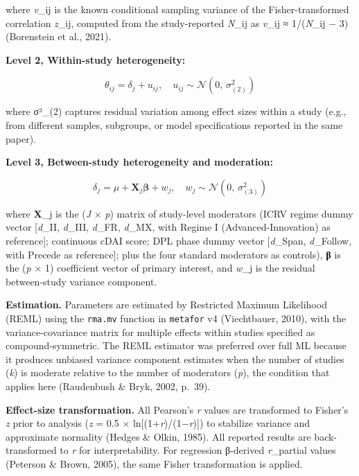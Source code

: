 \documentclass[
  12pt,a4paper]{article}
\begin{document}
where \emph{v}\_ij is the known conditional sampling variance of the
Fisher-transformed correlation \emph{z}\_ij, computed from the
study-reported \emph{N}\_ij as \emph{v}\_ij ≈ 1/(\emph{N}\_ij − 3)
(Borenstein et al., 2021).

\textbf{Level 2, Within-study heterogeneity:}

\[\theta_{ij} = \delta_{j} + u_{ij}, \quad u_{ij} \sim \mathcal{N}\left( 0, \, \sigma_{(2)}^{2} \right)\]

where σ²\_(2) captures residual variation among effect sizes within a
study (e.g., from different samples, subgroups, or model specifications
reported in the same paper).

\textbf{Level 3, Between-study heterogeneity and moderation:}

\[\delta_{j} = \mu + \mathbf{X}_{j}\mathbf{\beta} + w_{j}, \quad w_{j} \sim \mathcal{N}\left( 0, \, \sigma_{(3)}^{2} \right)\]

where \textbf{X}\_j is the (\emph{J} × \emph{p}) matrix of study-level
moderators (ICRV regime dummy vector {[}\emph{d}\_II, \emph{d}\_III,
\emph{d}\_FR, \emph{d}\_MX, with Regime I (Advanced-Innovation) as
reference{]}; continuous cDAI score; DPL phase dummy vector
{[}\emph{d}\_Span, \emph{d}\_Follow, with Precede as reference{]}; plus
the four standard moderators as controls), \textbf{β} is the (\emph{p} ×
1) coefficient vector of primary interest, and \emph{w}\_j is the
residual between-study variance component.

\textbf{Estimation.} Parameters are estimated by Restricted Maximum
Likelihood (REML) using the \texttt{rma.mv} function in \texttt{metafor}
v4 (Viechtbauer, 2010), with the variance-covariance matrix for multiple
effects within studies specified as compound-symmetric. The REML
estimator was preferred over full ML because it produces unbiased
variance component estimates when the number of studies (\emph{k}) is
moderate relative to the number of moderators (\emph{p}), the condition
that applies here (Raudenbush \& Bryk, 2002, p.~39).

\textbf{Effect-size transformation.} All Pearson's \emph{r} values are
transformed to Fisher's \emph{z} prior to analysis (\emph{z} = 0.5 ×
ln{[}(1+\emph{r})/(1−\emph{r}){]}) to stabilize variance and approximate
normality (Hedges \& Olkin, 1985). All reported results are
back-transformed to \emph{r} for interpretability. For regression
β-derived \emph{r}\_partial values (Peterson \& Brown, 2005), the same
Fisher transformation is applied.
\end{document}
